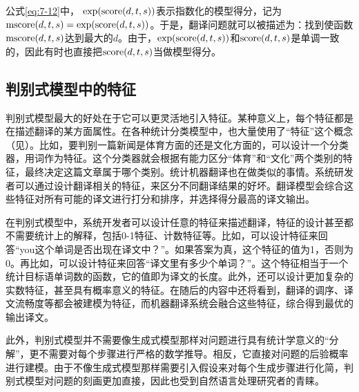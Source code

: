 \parinterval 公式\eqref{eq:7-12}中，$\ \textrm{exp}(\textrm{score}(d,\seq{t},\seq{s}))$表示指数化的模型得分，记为$\textrm{mscore}(d,{t},{s}) = \textrm{exp}(\textrm{score}(d,{t},{s}))$。于是，翻译问题就可以被描述为：找到使函数$\textrm{mscore}(d,{t},{s})$达到最大的$d$。由于，$\textrm{exp}(\textrm{score}(d,{t},{s}))$和$\textrm{score}(d,{t},{s})$是单调一致的，因此有时也直接把$\textrm{score}(d,{t},{s})$当做模型得分。


\subsection{判别式模型中的特征}


\parinterval 判别式模型最大的好处在于它可以更灵活地引入特征。某种意义上，每个特征都是在描述翻译的某方面属性。在各种统计分类模型中，也大量使用了“特征”这个概念（见{\chapterthree}）。比如，要判别一篇新闻是体育方面的还是文化方面的，可以设计一个分类器，用词作为特征。这个分类器就会根据有能力区分“体育”和“文化”两个类别的特征，最终决定这篇文章属于哪个类别。统计机器翻译也在做类似的事情。系统研发者可以通过设计翻译相关的特征，来区分不同翻译结果的好坏。翻译模型会综合这些特征对所有可能的译文进行打分和排序，并选择得分最高的译文输出。

\parinterval 在判别式模型中，系统开发者可以设计任意的特征来描述翻译，特征的设计甚至都不需要统计上的解释，包括0-1特征、计数特征等。比如，可以设计特征来回答“you这个单词是否出现在译文中？”。如果答案为真，这个特征的值为1，否则为0。再比如，可以设计特征来回答“译文里有多少个单词？”。这个特征相当于一个统计目标语单词数的函数，它的值即为译文的长度。此外，还可以设计更加复杂的实数特征，甚至具有概率意义的特征。在随后的内容中还将看到，翻译的调序、译文流畅度等都会被建模为特征，而机器翻译系统会融合这些特征，综合得到最优的输出译文。

\parinterval 此外，判别式模型并不需要像生成式模型那样对问题进行具有统计学意义的“分解”，更不需要对每个步骤进行严格的数学推导。相反，它直接对问题的后验概率进行建模。由于不像生成式模型那样需要引入假设来对每个生成步骤进行化简，判别式模型对问题的刻画更加直接，因此也受到自然语言处理研究者的青睐。


